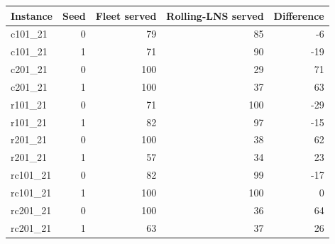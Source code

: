 \begin{tabular}{lrrrr}
\hline
Instance & Seed & Fleet served & Rolling-LNS served & Difference \\
\hline
c101\_21 & 0 & 79 & 85 & -6 \\
c101\_21 & 1 & 71 & 90 & -19 \\
c201\_21 & 0 & 100 & 29 & 71 \\
c201\_21 & 1 & 100 & 37 & 63 \\
r101\_21 & 0 & 71 & 100 & -29 \\
r101\_21 & 1 & 82 & 97 & -15 \\
r201\_21 & 0 & 100 & 38 & 62 \\
r201\_21 & 1 & 57 & 34 & 23 \\
rc101\_21 & 0 & 82 & 99 & -17 \\
rc101\_21 & 1 & 100 & 100 & 0 \\
rc201\_21 & 0 & 100 & 36 & 64 \\
rc201\_21 & 1 & 63 & 37 & 26 \\
\hline
\end{tabular}
